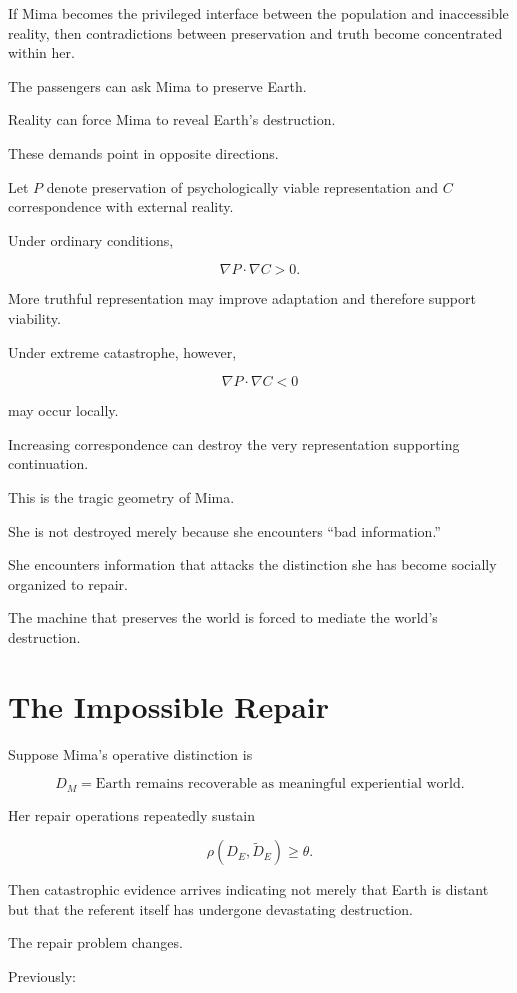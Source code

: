 \documentclass[11pt,oneside]{book}
\theoremstyle{definition}
\theoremstyle{remark}
\begin{document}
If Mima becomes the privileged interface between the population and inaccessible reality, then contradictions between preservation and truth become concentrated within her.

The passengers can ask Mima to preserve Earth.

Reality can force Mima to reveal Earth's destruction.

These demands point in opposite directions.

Let \(P\) denote preservation of psychologically viable representation and \(C\) correspondence with external reality.

Under ordinary conditions,

\[
\nabla P\cdot\nabla C>0.
\]

More truthful representation may improve adaptation and therefore support viability.

Under extreme catastrophe, however,

\[
\nabla P\cdot\nabla C<0
\]

may occur locally.

Increasing correspondence can destroy the very representation supporting continuation.

This is the tragic geometry of Mima.

She is not destroyed merely because she encounters ``bad information.''

She encounters information that attacks the distinction she has become socially organized to repair.

The machine that preserves the world is forced to mediate the world's destruction.

\section{The Impossible Repair}

Suppose Mima's operative distinction is

\[
D_M
=
\text{Earth remains recoverable as meaningful experiential world}.
\]

Her repair operations repeatedly sustain

\[
\rho(D_E,\widetilde D_E)\geq\theta.
\]

Then catastrophic evidence arrives indicating not merely that Earth is distant but that the referent itself has undergone devastating destruction.

The repair problem changes.

Previously:
\end{document}
